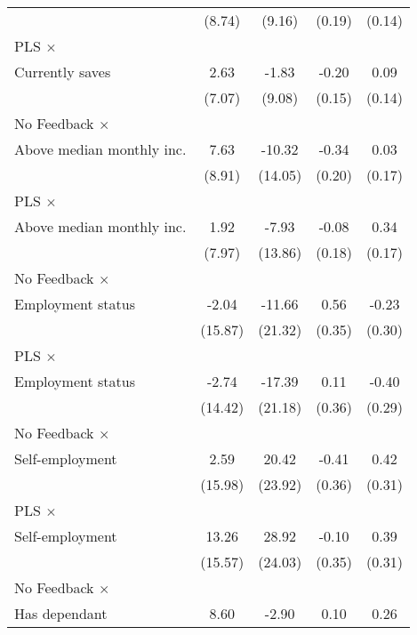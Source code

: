\begin{table}[htbp]
\begin{tabular}{l*{4}{c}}
                &   (8.74)         &   (9.16)         &   (0.19)         &   (0.14)         \\
\addlinespace
PLS $\times$ \\ Currently saves&     2.63         &    -1.83         &    -0.20         &     0.09         \\
                &   (7.07)         &   (9.08)         &   (0.15)         &   (0.14)         \\
\addlinespace
No Feedback $\times$ \\ Above median monthly inc.&     7.63         &   -10.32         &    -0.34\sym{*}  &     0.03         \\
                &   (8.91)         &  (14.05)         &   (0.20)         &   (0.17)         \\
\addlinespace
PLS $\times$ \\ Above median monthly inc.&     1.92         &    -7.93         &    -0.08         &     0.34\sym{**} \\
                &   (7.97)         &  (13.86)         &   (0.18)         &   (0.17)         \\
\addlinespace
No Feedback $\times$ \\ Employment status&    -2.04         &   -11.66         &     0.56         &    -0.23         \\
                &  (15.87)         &  (21.32)         &   (0.35)         &   (0.30)         \\
\addlinespace
PLS $\times$ \\ Employment status&    -2.74         &   -17.39         &     0.11         &    -0.40         \\
                &  (14.42)         &  (21.18)         &   (0.36)         &   (0.29)         \\
\addlinespace
No Feedback $\times$ \\ Self-employment&     2.59         &    20.42         &    -0.41         &     0.42         \\
                &  (15.98)         &  (23.92)         &   (0.36)         &   (0.31)         \\
\addlinespace
PLS $\times$ \\ Self-employment&    13.26         &    28.92         &    -0.10         &     0.39         \\
                &  (15.57)         &  (24.03)         &   (0.35)         &   (0.31)         \\
\addlinespace
No Feedback $\times$ \\ Has dependant&     8.60         &    -2.90         &     0.10         &     0.26         \\

\end{tabular}
\end{table}

